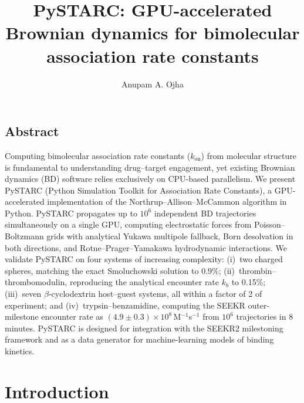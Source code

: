 \documentclass[journal=jctcce,manuscript=article,layout=twocolumn]{achemso}
\title[PySTARC]{\TitleSize
PySTARC: GPU-accelerated Brownian dynamics for bimolecular
association rate constants}
\author{\AuthorSize Anupam A. Ojha}
\newcommand{\kon}{k_{\mathrm{on}}}
\begin{document}
\begin{centering}
\section*{Abstract}
\end{centering}

Computing bimolecular association rate constants ($\kon$) from
molecular structure is fundamental to understanding drug--target
engagement, yet existing Brownian dynamics (BD) software relies
exclusively on CPU-based parallelism.
We present PySTARC (Python Simulation Toolkit for Association
Rate Constants), a GPU-accelerated implementation of the
Northrup--Allison--McCammon algorithm in Python.
PySTARC propagates up to $10^6$ independent BD trajectories
simultaneously on a single GPU, computing electrostatic forces
from Poisson--Boltzmann grids with analytical Yukawa multipole
fallback, Born desolvation in both directions, and
Rotne--Prager--Yamakawa hydrodynamic interactions.
We validate PySTARC on four systems of increasing complexity:
(i)~two charged spheres, matching the exact Smoluchowski solution
to 0.9\%;
(ii)~thrombin--thrombomodulin, reproducing the analytical encounter
rate $k_b$ to 0.15\%;
(iii)~seven $\beta$-cyclodextrin host--guest systems, all within
a factor of 2 of experiment; and
(iv)~trypsin--benzamidine, computing the SEEKR outer-milestone
encounter rate as $(4.9 \pm 0.3) \times 10^8$\,M$^{-1}$s$^{-1}$
from $10^6$ trajectories in 8 minutes.
PySTARC is designed for integration with the SEEKR2 milestoning
framework and as a data generator for machine-learning models of
binding kinetics.


\section{Introduction}
\end{document}
